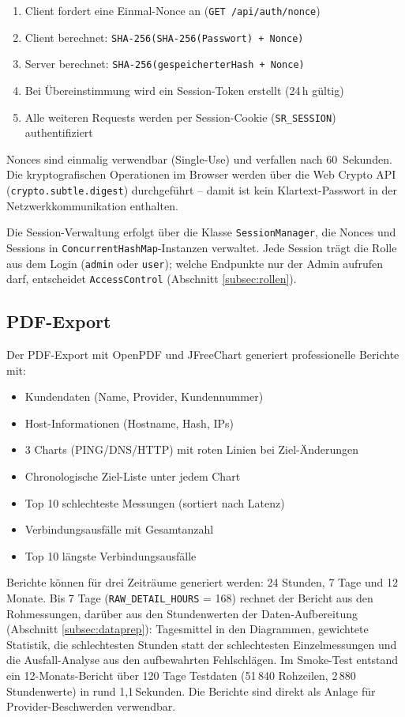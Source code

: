 \begin{enumerate}
  \item Client fordert eine Einmal-Nonce an (\texttt{GET /api/auth/nonce})
  \item Client berechnet: \texttt{SHA-256(SHA-256(Passwort) + Nonce)}
  \item Server berechnet: \texttt{SHA-256(gespeicherterHash + Nonce)}
  \item Bei Übereinstimmung wird ein Session-Token erstellt (24\,h gültig)
  \item Alle weiteren Requests werden per Session-Cookie (\texttt{SR\_SESSION}) authentifiziert
\end{enumerate}

Nonces sind einmalig verwendbar (Single-Use) und verfallen nach 60~Sekunden.
Die kryptografischen Operationen im Browser werden über die Web Crypto API
(\texttt{crypto.subtle.digest}) durchgeführt -- damit ist kein Klartext-Passwort
in der Netzwerkkommunikation enthalten.

Die Session-Verwaltung erfolgt über die Klasse \texttt{SessionManager}, die
Nonces und Sessions in \texttt{ConcurrentHashMap}-Instanzen verwaltet. Jede Session trägt
die Rolle aus dem Login (\texttt{admin} oder \texttt{user}); welche Endpunkte nur der Admin
aufrufen darf, entscheidet \texttt{AccessControl} (Abschnitt \ref{subsec:rollen}).

\subsection{PDF-Export}

Der PDF-Export mit OpenPDF und JFreeChart generiert professionelle Berichte mit:

\begin{itemize}
  \item Kundendaten (Name, Provider, Kundennummer)
  \item Host-Informationen (Hostname, Hash, IPs)
  \item 3 Charts (PING/DNS/HTTP) mit roten Linien bei Ziel-Änderungen
  \item Chronologische Ziel-Liste unter jedem Chart
  \item Top 10 schlechteste Messungen (sortiert nach Latenz)
  \item Verbindungsausfälle mit Gesamtanzahl
  \item Top 10 längste Verbindungsausfälle
\end{itemize}

Berichte können für drei Zeiträume generiert werden: 24 Stunden, 7 Tage und
12 Monate. Bis 7 Tage (\texttt{RAW\_DETAIL\_HOURS} = 168) rechnet der Bericht aus den
Rohmessungen, darüber aus den Stundenwerten der Daten-Aufbereitung (Abschnitt
\ref{subsec:dataprep}): Tagesmittel in den Diagrammen, gewichtete Statistik, die
schlechtesten Stunden statt der schlechtesten Einzelmessungen und die Ausfall-Analyse aus
den aufbewahrten Fehlschlägen. Im Smoke-Test entstand ein 12-Monats-Bericht über 120 Tage
Testdaten (51\,840 Rohzeilen, 2\,880 Stundenwerte) in rund 1,1\,Sekunden. Die Berichte sind
direkt als Anlage für Provider-Beschwerden verwendbar.

